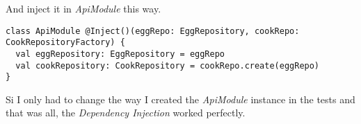 \documentclass[a4paper,11pt]{article}
\begin{document}
And inject it in \emph{ApiModule} this way.

\begin{lstlisting}[style=scala]
class ApiModule @Inject()(eggRepo: EggRepository, cookRepo: CookRepositoryFactory) {
  val eggRepository: EggRepository = eggRepo
  val cookRepository: CookRepository = cookRepo.create(eggRepo)
}
\end{lstlisting}

Si I only had to change the way I created the \emph{ApiModule} instance in the tests
and that was all, the \emph{Dependency Injection} worked perfectly.




\end{document}
